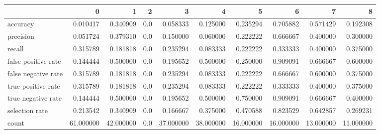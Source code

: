 \begin{tabular}{lrrrrrrrrr}
\toprule
{} &          0 &          1 &    2 &          3 &          4 &          5 &          6 &          7 &          8 \\
\midrule
accuracy            &   0.010417 &   0.340909 &  0.0 &   0.058333 &   0.125000 &   0.235294 &   0.705882 &   0.571429 &   0.192308 \\
precision           &   0.051724 &   0.379310 &  0.0 &   0.150000 &   0.060000 &   0.222222 &   0.666667 &   0.400000 &   0.300000 \\
recall              &   0.315789 &   0.181818 &  0.0 &   0.235294 &   0.083333 &   0.222222 &   0.333333 &   0.400000 &   0.375000 \\
false positive rate &   0.144444 &   0.500000 &  0.0 &   0.195652 &   0.500000 &   0.250000 &   0.909091 &   0.666667 &   0.600000 \\
false negative rate &   0.315789 &   0.181818 &  0.0 &   0.235294 &   0.083333 &   0.222222 &   0.666667 &   0.600000 &   0.375000 \\
true positive rate  &   0.315789 &   0.181818 &  0.0 &   0.235294 &   0.083333 &   0.222222 &   0.333333 &   0.400000 &   0.375000 \\
true negative rate  &   0.144444 &   0.500000 &  0.0 &   0.195652 &   0.500000 &   0.750000 &   0.909091 &   0.666667 &   0.400000 \\
selection rate      &   0.213542 &   0.340909 &  0.0 &   0.166667 &   0.375000 &   0.470588 &   0.823529 &   0.642857 &   0.269231 \\
count               &  61.000000 &  42.000000 &  0.0 &  37.000000 &  38.000000 &  16.000000 &  16.000000 &  13.000000 &  11.000000 \\
\bottomrule
\end{tabular}
